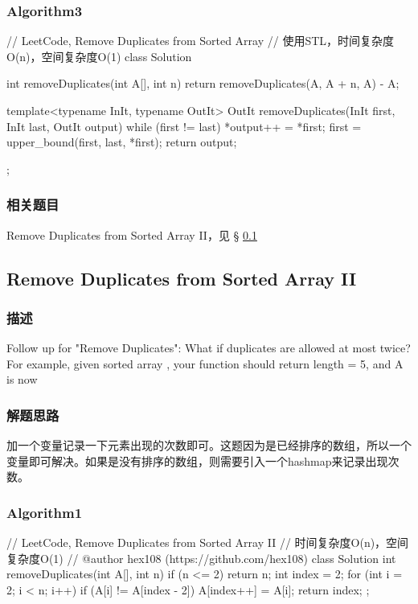 \subsubsection{Algorithm3}
\begin{Code}
	// LeetCode, Remove Duplicates from Sorted Array
	// 使用STL，时间复杂度O(n)，空间复杂度O(1)
	class Solution {
		int removeDuplicates(int A[], int n) {
			return removeDuplicates(A, A + n, A) - A;
		}
		
		template<typename InIt, typename OutIt>
		OutIt removeDuplicates(InIt first, InIt last, OutIt output) {
			while (first != last) {
				*output++ = *first;
				first = upper_bound(first, last, *first);
			}
			return output;
		}
	};
\end{Code}

\subsubsection{相关题目}

\begindot
\item Remove Duplicates from Sorted Array II，见 \S 
\ref{sec:remove-duplicates-from-sorted-array-ii}
\myenddot


\subsection{Remove Duplicates from Sorted Array II}
\label{sec:remove-duplicates-from-sorted-array-ii}


\subsubsection{描述}
Follow up for "Remove Duplicates":
What if duplicates are allowed at most twice?
For example,
given sorted array ,
your function should return length = 5, and A is now \code{[1,1,2,2,3]}

\subsubsection{解题思路}
加一个变量记录一下元素出现的次数即可。这题因为是已经排序的数组，所以一个变量即可解决。如果是没有排序的数组，则需要引入一个hashmap来记录出现次数。


\subsubsection{Algorithm1}
\begin{Code}
	// LeetCode, Remove Duplicates from Sorted Array II
	// 时间复杂度O(n)，空间复杂度O(1)
	// @author hex108 (https://github.com/hex108)
	class Solution {
		int removeDuplicates(int A[], int n) {
			if (n <= 2) return n;
			int index = 2;
			for (int i = 2; i < n; i++){
				if (A[i] != A[index - 2])
					A[index++] = A[i];
			}
			return index;
		}
	};
\end{Code}


